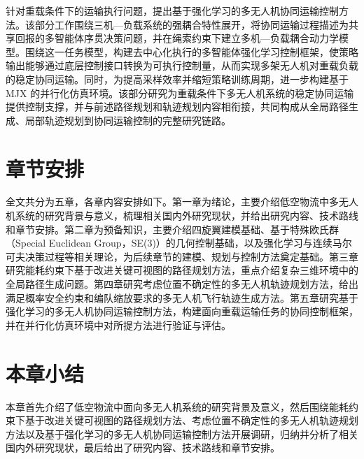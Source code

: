 针对重载条件下的运输执行问题，提出基于强化学习的多无人机协同运输控制方法。该部分工作围绕三机---负载系统的强耦合特性展开，将协同运输过程描述为共享回报的多智能体序贯决策问题，并在绳索约束下建立多机---负载耦合动力学模型。围绕这一任务模型，构建去中心化执行的多智能体强化学习控制框架，使策略输出能够通过底层控制接口转换为可执行控制量，从而实现多架无人机对重载负载的稳定协同运输。同时，为提高采样效率并缩短策略训练周期，进一步构建基于 MJX 的并行化仿真环境。该部分研究为重载条件下多无人机系统的稳定协同运输提供控制支撑，并与前述路径规划和轨迹规划内容相衔接，共同构成从全局路径生成、局部轨迹规划到协同运输控制的完整研究链路。

\section{章节安排}

全文共分为五章，各章内容安排如下。第一章为绪论，主要介绍低空物流中多无人机系统的研究背景与意义，梳理相关国内外研究现状，并给出研究内容、技术路线和章节安排。第二章为预备知识，主要介绍四旋翼建模基础、基于特殊欧氏群（Special Euclidean Group，SE(3)）的几何控制基础，以及强化学习与连续马尔可夫决策过程等相关理论，为后续章节的建模、规划与控制方法奠定基础。第三章研究能耗约束下基于改进关键可视图的路径规划方法，重点介绍复杂三维环境中的全局路径生成问题。第四章研究考虑位置不确定性的多无人机轨迹规划方法，给出满足概率安全约束和编队缩放要求的多无人机飞行轨迹生成方法。第五章研究基于强化学习的多无人机协同运输控制方法，构建面向重载运输任务的协同控制框架，并在并行化仿真环境中对所提方法进行验证与评估。

\section{本章小结}

本章首先介绍了低空物流中面向多无人机系统的研究背景及意义，然后围绕能耗约束下基于改进关键可视图的路径规划方法、考虑位置不确定性的多无人机轨迹规划方法以及基于强化学习的多无人机协同运输控制方法开展调研，归纳并分析了相关国内外研究现状，最后给出了研究内容、技术路线和章节安排。
